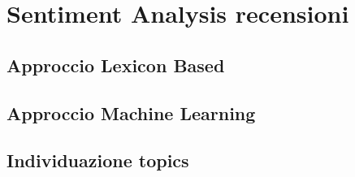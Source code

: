 \section{Sentiment Analysis recensioni}\label{SentimentAnalysis}

\subsection{Approccio Lexicon Based}



\subsection{Approccio Machine Learning}




\subsection{Individuazione topics}
